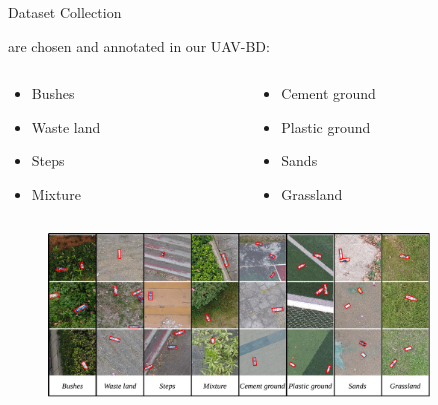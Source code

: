 \documentclass[newPxFont, fullfooter, sectionpages, progressbar, displaynote]{beamer}
\begin{document}

\begin{frame}{Dataset Collection}

	 are chosen and annotated in our UAV-BD:

	\begin{columns}[c]
		\begin{column}{0.3\textwidth}
			\begin{itemize}
			\item \small{Bushes}
			\item \small{Waste land}
			\item \small{Steps}
			\item \small{Mixture}
			\end{itemize}
		\end{column}

		\begin{column}{0.3\textwidth}
			\begin{itemize}
			\item \small{Cement ground}
			\item \small{Plastic ground}
			\item \small{Sands}
			\item \small{Grassland}
			\end{itemize}
		\end{column}
	\end{columns}
	\begin{figure}
		\centering
		\includegraphics[width=0.9\textwidth]{images/dataset2.png}
	\end{figure}
\end{frame}

\end{document}
